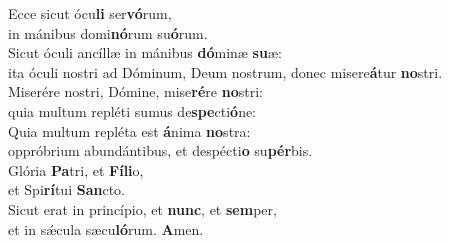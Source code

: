 \evenverse Ecce sicut ócu\textbf{li} ser\textbf{vó}rum,~\*\\
\evenverse in mánibus domi\textbf{nó}rum su\textbf{ó}rum.\\
\oddverse Sicut óculi ancíllæ in mánibus \textbf{dó}minæ \textbf{su}æ:~\*\\
\oddverse ita óculi nostri ad Dóminum, Deum nostrum, donec misere\textbf{á}tur \textbf{no}stri.\\
\evenverse Miserére nostri, Dómine, mise\textbf{ré}re \textbf{no}stri:~\*\\
\evenverse quia multum repléti sumus de\textbf{spe}cti\textbf{ó}ne:\\
\oddverse Quia multum repléta est \textbf{á}nima \textbf{no}stra:~\*\\
\oddverse oppróbrium abundántibus, et despécti\textbf{o} su\textbf{pér}bis.\\
\evenverse Glória \textbf{Pa}tri, et \textbf{Fí}\textbf{li}o,~\*\\
\evenverse et Spi\textbf{rí}tui \textbf{San}cto.\\
\oddverse Sicut erat in princípio, et \textbf{nunc}, et \textbf{sem}per,~\*\\
\oddverse et in sǽcula sæcu\textbf{ló}rum. \textbf{A}men.\\

